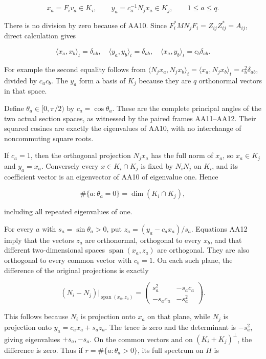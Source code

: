 \[
x_a=F_iv_a\in K_i,\qquad
y_a=c_a^{-1}N_jx_a\in K_j,
\qquad 1\le a\le q.
\tag{AA11}
\]

There is no division by zero because of AA10. Since \(F_i^*MN_jF_i=Z_{ij}Z_{ij}^*=A_{ij}\), direct calculation gives

\[
\langle x_a,x_b\rangle_t=\delta_{ab},\quad
\langle y_a,y_b\rangle_t=\delta_{ab},\quad
\langle x_a,y_b\rangle_t=c_b\delta_{ab}.
\tag{AA12}
\]

For example the second equality follows from \(\langle N_jx_a,N_jx_b\rangle_t
=\langle x_a,N_jx_b\rangle_t=c_b^2\delta_{ab}\), divided by \(c_ac_b\). The \(y_a\) form a basis of \(K_j\) because they are \(q\) orthonormal vectors in that space.

Define \(\theta_a\in[0,\pi/2)\) by \(c_a=\cos\theta_a\). These are the complete principal angles of the two actual section spaces, as witnessed by the paired frames AA11--AA12. Their squared cosines are exactly the eigenvalues of AA10, with no interchange of noncommuting square roots.

If \(c_a=1\), then the orthogonal projection \(N_jx_a\) has the full norm of \(x_a\), so \(x_a\in K_j\) and \(y_a=x_a\). Conversely every \(x\in K_i\cap K_j\) is fixed by \(N_iN_j\) on \(K_i\), and its coefficient vector is an eigenvector of AA10 of eigenvalue one. Hence

\[
\#\{a:\theta_a=0\}=\dim(K_i\cap K_j),
\tag{AA13}
\]

including all repeated eigenvalues of one.

For every \(a\) with \(s_a=\sin\theta_a>0\), put \(z_a=(y_a-c_ax_a)/s_a\). Equations AA12 imply that the vectors \(z_a\) are orthonormal, orthogonal to every \(x_b\), and that different two-dimensional spaces \(\operatorname{span}(x_a,z_a)\) are orthogonal. They are also orthogonal to every common vector with \(c_b=1\). On each such plane, the difference of the original projections is exactly

\[
(N_i-N_j)|_{\operatorname{span}(x_a,z_a)}
=\begin{pmatrix}s_a^2&-s_ac_a\\-s_ac_a&-s_a^2\end{pmatrix}.
\tag{AA14}
\]

This follows because \(N_i\) is projection onto \(x_a\) on that plane, while \(N_j\) is projection onto \(y_a=c_ax_a+s_az_a\). The trace is zero and the determinant is \(-s_a^2\), giving eigenvalues \(+s_a,-s_a\). On the common vectors and on \((K_i+K_j)^\perp\), the difference is zero. Thus if \(r=\#\{a:\theta_a>0\}\), its full spectrum on \(H\) is


